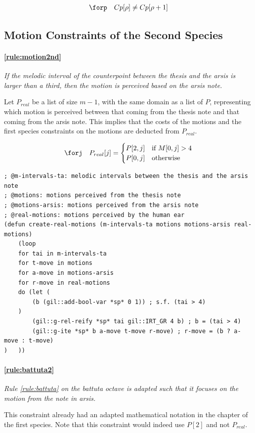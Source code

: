 \begin{equation}
    \begin{gathered}
        \forp \quad
        Cp[\rho] \neq Cp[\rho+1]
    \end{gathered}
\end{equation}

\subsection{Motion Constraints of the Second Species}

\paragraph{\ref{rule:motion2nd}} \textit{If the melodic interval of the counterpoint between the thesis and the arsis is larger than a third, then the motion is perceived based on the arsis note.}

Let $P_{real}$ be a list of size $m-1$, with the same domain as a list of $P$, representing which motion is perceived between that coming from the thesis note and that coming from the arsis note. This implies that the costs of the motions and the first species constraints on the motions are deducted from $P_{real}$.

\begin{equation}
    \begin{gathered}
        \forj \quad
        P_{real}[j] = \begin{cases}
            P[2, j] & \text{if } M[0, j] > 4\\
            P[0, j] & \text{otherwise}
        \end{cases}
    \end{gathered}
\end{equation}

\begin{lstlisting}[caption=Function that constrains $P_{real}$ to represent the real motions., label=lst:realmotions, basicstyle=\ttfamily\scriptsize]
; @m-intervals-ta: melodic intervals between the thesis and the arsis note
; @motions: motions perceived from the thesis note
; @motions-arsis: motions perceived from the arsis note
; @real-motions: motions perceived by the human ear
(defun create-real-motions (m-intervals-ta motions motions-arsis real-motions)
    (loop
    for tai in m-intervals-ta
    for t-move in motions
    for a-move in motions-arsis
    for r-move in real-motions
    do (let (
        (b (gil::add-bool-var *sp* 0 1)) ; s.f. (tai > 4)
    )
        (gil::g-rel-reify *sp* tai gil::IRT_GR 4 b) ; b = (tai > 4)
        (gil::g-ite *sp* b a-move t-move r-move) ; r-move = (b ? a-move : t-move)
)   ))
\end{lstlisting}

\paragraph{\ref{rule:battuta2}} \textit{Rule \ref{rule:battuta} on the battuta octave is adapted such that it focuses on the motion from the note in arsis.}

This constraint already had an adapted mathematical notation in the chapter of the first species. Note that this constraint would indeed use $P[2]$ and not $P_{real}$.